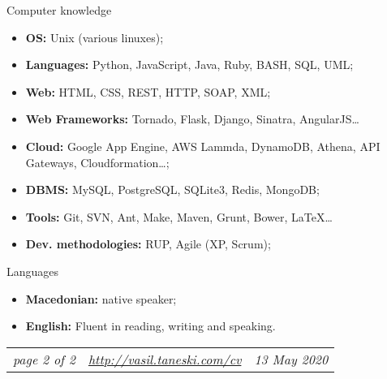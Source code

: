 \documentclass[]{mcdowellcv}
\begin{document}
    \begin{cvsection}{Computer knowledge}
    \label{Computer knowledge}
        \begin{cvsubsection}{}{}{}
            \begin{itemize}
                \item \textbf{OS:} Unix (various linuxes);
                \item \textbf{Languages:} Python, JavaScript, Java, Ruby, BASH, SQL, UML;
                \vspace{1mm}
                \item \textbf{Web:} HTML, CSS, REST, HTTP, SOAP, XML;
                \item \textbf{Web Frameworks:} Tornado, Flask, Django, Sinatra, AngularJS\ldots
                \vspace{1mm}
                \item \textbf{Cloud:} Google App Engine, AWS Lammda, DynamoDB, Athena, API Gateways, Cloudformation\ldots;
                \vspace{1mm}
                \item \textbf{DBMS:} MySQL, PostgreSQL, SQLite3, Redis, MongoDB;
                \item \textbf{Tools:} Git, SVN, Ant, Make, Maven, Grunt, Bower, \LaTeX\ldots
                \vspace{1mm}
                \item \textbf{Dev. methodologies:} RUP, Agile (XP, Scrum);
            \end{itemize}
        \end{cvsubsection}
    \end{cvsection}
    \vspace*{20pt}

    \begin{cvsection}{Languages}
    \label{Languages}
        \begin{cvsubsection}{}{}{}
            \begin{itemize}
                \item \textbf{Macedonian:} native speaker;
                \item \textbf{English:} Fluent in reading, writing and speaking.
            \end{itemize}
        \end{cvsubsection}
    \end{cvsection}

    \vfill
    \begin{tabu} to 1\textwidth {X[l,m] X[c,m] X[r,m]}
        \textit{page 2 of 2} &
        \textit{\url{http://vasil.taneski.com/cv}} &
        \textit{13 May 2020}
    \end{tabu}
    \clearpage
\end{document}
